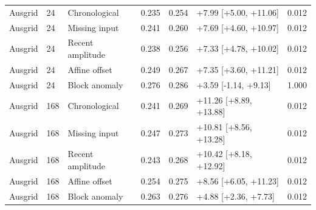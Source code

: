 {\begin{longtable}{lllrrp{3.65cm}r}
Ausgrid & 24 & Chronological & 0.235 & 0.254 & +7.99 [+5.00, +11.06] & 0.012 \\
Ausgrid & 24 & Missing input & 0.241 & 0.260 & +7.69 [+4.60, +10.97] & 0.012 \\
Ausgrid & 24 & Recent amplitude & 0.238 & 0.256 & +7.33 [+4.78, +10.02] & 0.012 \\
Ausgrid & 24 & Affine offset & 0.249 & 0.267 & +7.35 [+3.60, +11.21] & 0.012 \\
Ausgrid & 24 & Block anomaly & 0.276 & 0.286 & +3.59 [-1.14, +9.13] & 1.000 \\
Ausgrid & 168 & Chronological & 0.241 & 0.269 & +11.26 [+8.89, +13.88] & 0.012 \\
Ausgrid & 168 & Missing input & 0.247 & 0.273 & +10.81 [+8.56, +13.28] & 0.012 \\
Ausgrid & 168 & Recent amplitude & 0.243 & 0.268 & +10.42 [+8.18, +12.92] & 0.012 \\
Ausgrid & 168 & Affine offset & 0.254 & 0.275 & +8.56 [+6.05, +11.23] & 0.012 \\
Ausgrid & 168 & Block anomaly & 0.263 & 0.276 & +4.88 [+2.36, +7.73] & 0.012 \\
\bottomrule
\end{longtable}
}
